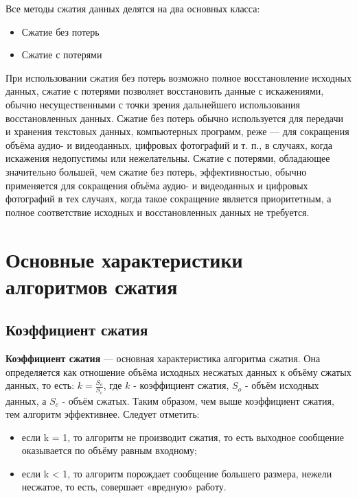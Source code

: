 \documentclass[a4paper]{report}
\begin{document}
Все методы сжатия данных делятся на два основных класса:
\begin{itemize}
\item Сжатие без потерь
\item Сжатие с потерями
\end{itemize}
При использовании сжатия без потерь возможно полное восстановление исходных данных, сжатие с потерями позволяет восстановить данные с искажениями, обычно несущественными с точки зрения дальнейшего использования восстановленных данных. Сжатие без потерь обычно используется для передачи и хранения текстовых данных, компьютерных программ, реже — для сокращения объёма аудио- и видеоданных, цифровых фотографий и т. п., в случаях, когда искажения недопустимы или нежелательны. Сжатие с потерями, обладающее значительно большей, чем сжатие без потерь, эффективностью, обычно применяется для сокращения объёма аудио- и видеоданных и цифровых фотографий в тех случаях, когда такое сокращение является приоритетным, а полное соответствие исходных и восстановленных данных не требуется. 
\section{Основные характеристики алгоритмов сжатия}
\subsection{Коэффициент сжатия}
\textbf{Коэффициент сжатия} — основная характеристика алгоритма сжатия. Она определяется как отношение объёма исходных несжатых данных к объёму сжатых данных, то есть: $k = \frac{S_o}{S_c}$, где $k$ - коэффициент сжатия, $S_o$ - объём исходных данных, а $S_c$ - объём сжатых. Таким образом, чем выше коэффициент сжатия, тем алгоритм эффективнее. Следует отметить:
\begin{itemize}
\item если k = 1, то алгоритм не производит сжатия, то есть выходное сообщение оказывается по объёму равным входному;
\item если k < 1, то алгоритм порождает сообщение большего размера, нежели несжатое, то есть, совершает «вредную» работу.
\end{itemize}
\end{document}
